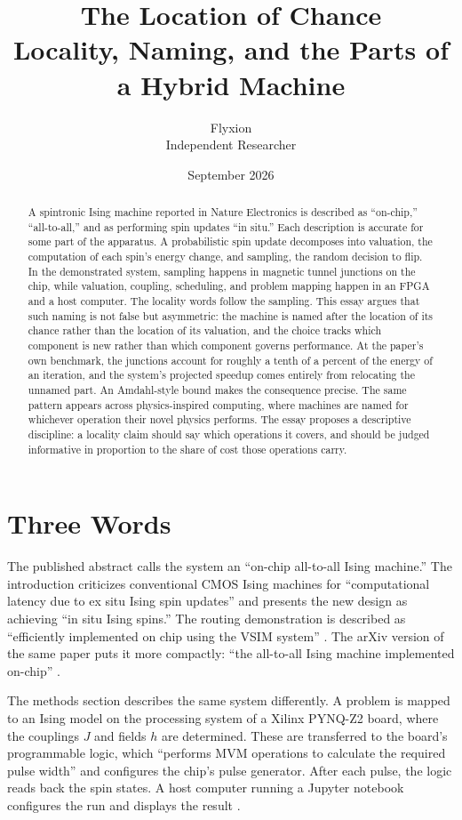 \documentclass[11pt]{article}
\title{The Location of Chance\\[4pt]
\large Locality, Naming, and the Parts of a Hybrid Machine}
\author{Flyxion\\ Independent Researcher}
\date{September 2026}
\theoremstyle{definition}
\theoremstyle{remark}
\begin{document}
\maketitle

\begin{abstract}
A spintronic Ising machine reported in Nature Electronics is described as ``on-chip,'' ``all-to-all,'' and as performing spin updates ``in situ.'' Each description is accurate for some part of the apparatus. A probabilistic spin update decomposes into valuation, the computation of each spin's energy change, and sampling, the random decision to flip. In the demonstrated system, sampling happens in magnetic tunnel junctions on the chip, while valuation, coupling, scheduling, and problem mapping happen in an FPGA and a host computer. The locality words follow the sampling. This essay argues that such naming is not false but asymmetric: the machine is named after the location of its chance rather than the location of its valuation, and the choice tracks which component is new rather than which component governs performance. At the paper's own benchmark, the junctions account for roughly a tenth of a percent of the energy of an iteration, and the system's projected speedup comes entirely from relocating the unnamed part. An Amdahl-style bound makes the consequence precise. The same pattern appears across physics-inspired computing, where machines are named for whichever operation their novel physics performs. The essay proposes a descriptive discipline: a locality claim should say which operations it covers, and should be judged informative in proportion to the share of cost those operations carry.
\end{abstract}

\section{Three Words}

The published abstract calls the system an ``on-chip all-to-all Ising machine.'' The introduction criticizes conventional CMOS Ising machines for ``computational latency due to ex situ Ising spin updates'' and presents the new design as achieving ``in situ Ising spins.'' The routing demonstration is described as ``efficiently implemented on chip using the VSIM system'' \cite{li2026}. The arXiv version of the same paper puts it more compactly: ``the all-to-all Ising machine implemented on-chip'' \cite{li2025arxiv}.

The methods section describes the same system differently. A problem is mapped to an Ising model on the processing system of a Xilinx PYNQ-Z2 board, where the couplings $J$ and fields $h$ are determined. These are transferred to the board's programmable logic, which ``performs MVM operations to calculate the required pulse width'' and configures the chip's pulse generator. After each pulse, the logic reads back the spin states. A host computer running a Jupyter notebook configures the run and displays the result \cite{li2026}.
\end{document}
